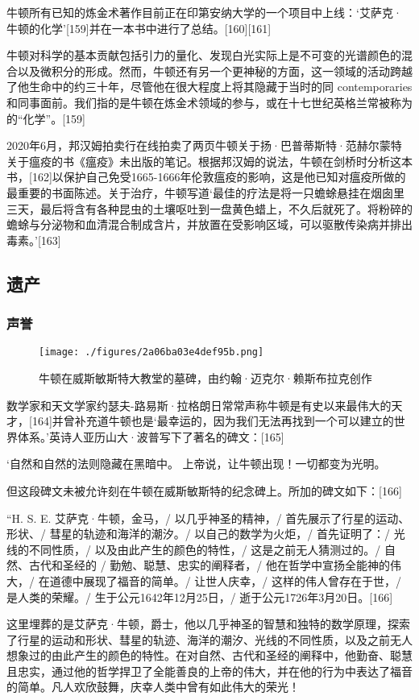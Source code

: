 牛顿所有已知的炼金术著作目前正在印第安纳大学的一个项目中上线：‘艾萨克·牛顿的化学’[159]并在一本书中进行了总结。[160][161]

牛顿对科学的基本贡献包括引力的量化、发现白光实际上是不可变的光谱颜色的混合以及微积分的形成。然而，牛顿还有另一个更神秘的方面，这一领域的活动跨越了他生命中的约三十年，尽管他在很大程度上将其隐藏于当时的同 contemporaries 和同事面前。我们指的是牛顿在炼金术领域的参与，或在十七世纪英格兰常被称为的“化学”。[159]

2020年6月，邦汉姆拍卖行在线拍卖了两页牛顿关于扬·巴普蒂斯特·范赫尔蒙特关于瘟疫的书《瘟疫》未出版的笔记。根据邦汉姆的说法，牛顿在剑桥时分析这本书，[162]以保护自己免受1665-1666年伦敦瘟疫的影响，这是他已知对瘟疫所做的最重要的书面陈述。关于治疗，牛顿写道‘最佳的疗法是将一只蟾蜍悬挂在烟囱里三天，最后将含有各种昆虫的土壤呕吐到一盘黄色蜡上，不久后就死了。将粉碎的蟾蜍与分泌物和血清混合制成含片，并放置在受影响区域，可以驱散传染病并排出毒素。’[163]
\subsection{遗产}  
\subsubsection{声誉}
\begin{figure}[ht]
\centering
\texttt{[image: ./figures/2a06ba03e4def95b.png]}
\caption{牛顿在威斯敏斯特大教堂的墓碑，由约翰·迈克尔·赖斯布拉克创作} \label{fig_Newton_12}
\end{figure}
数学家和天文学家约瑟夫-路易斯·拉格朗日常常声称牛顿是有史以来最伟大的天才，[164]并曾补充道牛顿也是‘最幸运的，因为我们无法再找到一个可以建立的世界体系。’英诗人亚历山大·波普写下了著名的碑文：[165]

‘自然和自然的法则隐藏在黑暗中。  
上帝说，让牛顿出现！一切都变为光明。

但这段碑文未被允许刻在牛顿在威斯敏斯特的纪念碑上。所加的碑文如下：[166]

“H. S. E. 艾萨克·牛顿，金马，/ 以几乎神圣的精神，/ 首先展示了行星的运动、形状、/ 彗星的轨迹和海洋的潮汐。/ 以自己的数学为火炬，/ 首先证明了：/ 光线的不同性质，/ 以及由此产生的颜色的特性，/ 这是之前无人猜测过的。/ 自然、古代和圣经的 / 勤勉、聪慧、忠实的阐释者，/ 他在哲学中宣扬全能神的伟大，/ 在道德中展现了福音的简单。/ 让世人庆幸，/ 这样的伟人曾存在于世，/ 是人类的荣耀。/ 生于公元1642年12月25日，/ 逝于公元1726年3月20日。[166]

这里埋葬的是艾萨克·牛顿，爵士，他以几乎神圣的智慧和独特的数学原理，探索了行星的运动和形状、彗星的轨迹、海洋的潮汐、光线的不同性质，以及之前无人想象过的由此产生的颜色的特性。在对自然、古代和圣经的阐释中，他勤奋、聪慧且忠实，通过他的哲学捍卫了全能善良的上帝的伟大，并在他的行为中表达了福音的简单。凡人欢欣鼓舞，庆幸人类中曾有如此伟大的荣光！

